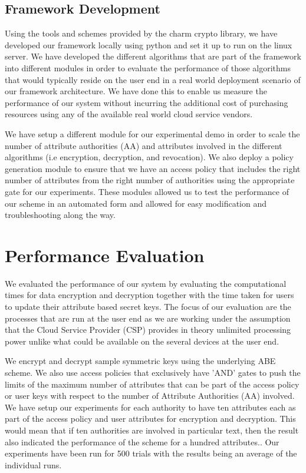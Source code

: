 \subsection{Framework Development}

Using the tools and schemes provided by the charm crypto library, we have developed our framework locally using python and set it up to run on the linux server. We have developed the different algorithms that are part of the framework into different modules in order to evaluate the performance of those algorithms that would typically reside on the user end in a real world deployment scenario of our framework architecture. We have done this to enable us measure the performance of our system without incurring the additional cost of purchasing resources using any of the available real world cloud service vendors.

We have setup a different module for our experimental demo in order to scale the number of attribute authorities (AA) and attributes involved in the different algorithms (i.e encryption, decryption, and revocation). We also deploy a policy generation module to ensure that we have an access policy that includes the right number of attributes from the right number of authorities using the appropriate gate for our experiments. These modules allowed us to test the performance of our scheme in an automated form and allowed for easy modification and troubleshooting along the way.

\section{Performance Evaluation}

We evaluated the performance of our system by evaluating the computational times for data encryption and decryption together with the time taken for users to update their attribute based secret keys. The focus of our evaluation are the processes that are run at the user end as we are working under the assumption that the Cloud Service Provider (CSP) provides in theory unlimited processing power unlike what could be available on the several devices at the user end.

We encrypt and decrypt sample symmetric keys using the underlying ABE scheme. We also use access policies that exclusively have 'AND' gates to push the limits of the maximum number of attributes that can be part of the access policy or user keys with respect to the number of Attribute Authorities (AA) involved. We have setup our experiments for each authority to have ten attributes each as part of the access policy and user attributes for encryption and decryption. This would mean that if ten authorities are involved in particular text, then the result also indicated the performance of the scheme for a hundred attributes.. Our experiments have been run for 500 trials with the results being an average of the individual runs.

